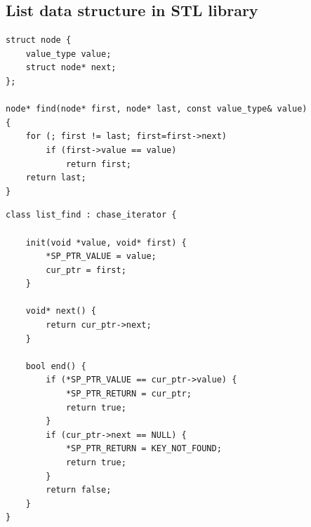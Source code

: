 \lstset{frame=tb,
  xleftmargin=0cm,
  linewidth=0.95\textwidth
}
\captionsetup[lstlisting]{style=centered_lstlisting}

\vspace{2em}

\begin{minipage}{0.47\textwidth}
\subsection{List data structure in STL library}
\centering
\begin{lstlisting}[caption={C++ STL realization for \code{std::find()}},label={lst:list}, captionpos=t]
struct node {
    value_type value;
    struct node* next;
};

node* find(node* first, node* last, const value_type& value)
{
    for (; first != last; first=first->next)
        if (first->value == value)
            return first;
    return last;
}
\end{lstlisting}

\begin{lstlisting}[caption={\pulse realization for \code{std::find()}},label={lst:list_mod}, captionpos=t]
class list_find : chase_iterator {

    init(void *value, void* first) {
        *SP_PTR_VALUE = value;
        cur_ptr = first;
    }
  
    void* next() {
        return cur_ptr->next;
    }
  
    bool end() {
        if (*SP_PTR_VALUE == cur_ptr->value) {
            *SP_PTR_RETURN = cur_ptr;  
            return true;
        }
        if (cur_ptr->next == NULL) {
            *SP_PTR_RETURN = KEY_NOT_FOUND;  
            return true;
        }
        return false;
    }
}
\end{lstlisting}
\end{minipage}


